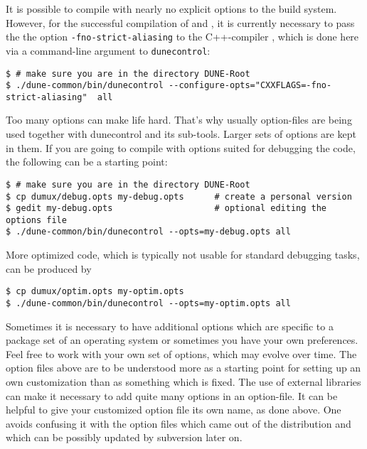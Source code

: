 It is possible to compile \Dumux with nearly no explicit options to the build system.
However, for the successful compilation of \Dune and \Dumux, it is currently necessary to pass the
the option \texttt{-fno-strict-aliasing} to the C++-compiler
\cite{WIKIPED-ALIASING}, which is done here via a command-line argument to \texttt{dunecontrol}:


\begin{lstlisting}[style=Bash]
$ # make sure you are in the directory DUNE-Root
$ ./dune-common/bin/dunecontrol --configure-opts="CXXFLAGS=-fno-strict-aliasing"  all
\end{lstlisting}

Too many options can make life hard. That's why usually option-files are being used together with dunecontrol and its sub-tools.
Larger sets of options are kept in them. If you are going to compile with options suited for debugging the code, the following
can be a starting point:


\begin{lstlisting}[style=Bash]
$ # make sure you are in the directory DUNE-Root
$ cp dumux/debug.opts my-debug.opts      # create a personal version
$ gedit my-debug.opts                    # optional editing the options file 
$ ./dune-common/bin/dunecontrol --opts=my-debug.opts all 
\end{lstlisting}

More optimized code, which is typically not usable for standard debugging tasks, can be produced by 

\begin{lstlisting}[style=Bash]
$ cp dumux/optim.opts my-optim.opts 
$ ./dune-common/bin/dunecontrol --opts=my-optim.opts all
\end{lstlisting}

Sometimes it is necessary to have additional options which
are specific to a package set of an operating system or
sometimes you have your own preferences.
Feel free to work with your own set of options, which may evolve over time.
The option files above are to be understood more as a starting point
for setting up an own customization than as something which is fixed.
The use of external libraries can make it necessary to add quite many options in an option-file.
It can be helpful to give your customized option file its own name, as done above.
One avoids confusing it with the option files which came out of the distribution
and which can be possibly updated by subversion later on.

